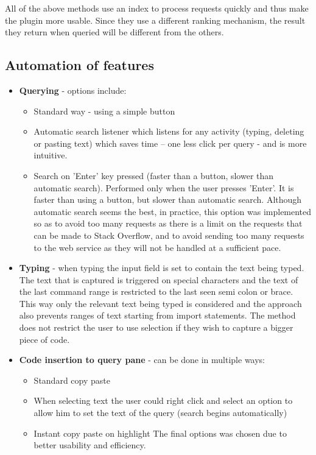 \documentclass{l4proj}
\begin{document}
All of the above methods use an index to process requests quickly and thus make the plugin more usable. Since they use a different ranking mechanism, the result they return when queried will be different from the others.

\subsection{Automation of features}
\begin{itemize}

\item \textbf{Querying} - options include:
\begin{itemize}
\item Standard way - using a simple button
\item Automatic search listener which listens for any activity (typing, deleting or pasting text) which saves time – one less click per query - and is more intuitive.
\item Search on 'Enter' key pressed (faster than a button, slower than automatic search). Performed only when the user presses 'Enter'. It is faster than using a button, but slower than automatic search. Although automatic search seems the best, in practice, this option was implemented so as to avoid too many requests as there is a limit on the requests that can be made to Stack Overflow, and to avoid sending too many requests to the web service as they will not be handled at a sufficient pace.
\end{itemize}

\item \textbf{Typing} - when typing the input field is set to contain the text being typed. The text that is captured is triggered on special characters and the text of the last command range is restricted to the last seen semi colon or brace. This way only the relevant text being typed is considered and the approach also prevents ranges of text starting from import statements. The method does not restrict the user to use selection if they wish to capture a bigger piece of code.  

\item \textbf{Code insertion to query pane} - can be done in multiple ways:
\begin{itemize}
\item Standard copy paste
\item When selecting text the user could right click and select an option to allow him to set the text of the query (search begins automatically) 
\item Instant copy paste on highlight
The final options was chosen due to better usability and efficiency.
\end{itemize}

\end{itemize}
\end{document}
